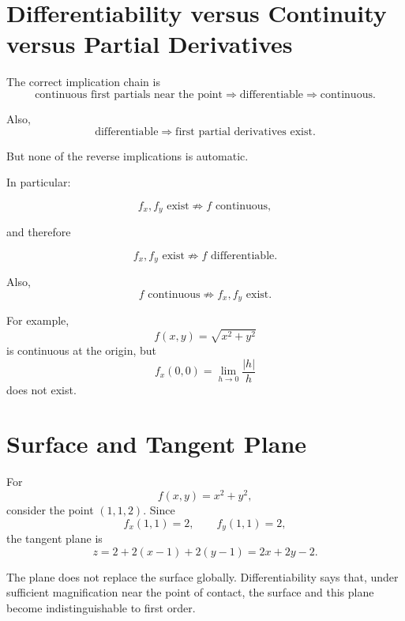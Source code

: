 \documentclass[11pt,oneside]{book}
\theoremstyle{studentthm}
\theoremstyle{definition}
\begin{document}
\section{Differentiability versus Continuity versus Partial Derivatives}

The correct implication chain is
\[
\text{continuous first partials near the point}
\Longrightarrow
\text{differentiable}
\Longrightarrow
\text{continuous}.
\]

Also,
\[
\text{differentiable}
\Longrightarrow
\text{first partial derivatives exist}.
\]

But none of the reverse implications is automatic.

In particular:

\[
f_x,f_y\text{ exist}
\not\Rightarrow
f\text{ continuous},
\]

and therefore

\[
f_x,f_y\text{ exist}
\not\Rightarrow
f\text{ differentiable}.
\]

Also,
\[
f\text{ continuous}
\not\Rightarrow
f_x,f_y\text{ exist}.
\]

For example,
\[
f(x,y)=\sqrt{x^2+y^2}
\]
is continuous at the origin, but
\[
f_x(0,0)
=
\lim_{h\to0}
\frac{|h|}{h}
\]
does not exist.


\section{Surface and Tangent Plane}

For
\[
f(x,y)=x^2+y^2,
\]
consider the point \((1,1,2)\). Since
\[
f_x(1,1)=2,\qquad f_y(1,1)=2,
\]
the tangent plane is
\[
z=2+2(x-1)+2(y-1)
=
2x+2y-2.
\]

\begin{center}
\end{center}

The plane does not replace the surface globally. Differentiability says
that, under sufficient magnification near the point of contact, the
surface and this plane become indistinguishable to first order.
\end{document}
